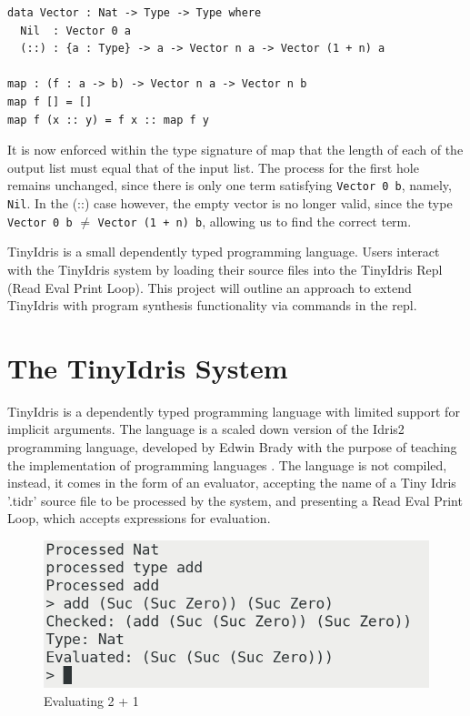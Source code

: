 \documentclass[a4paper]{article}
\begin{document}
\begin{center}
\begin{verbatim}
data Vector : Nat -> Type -> Type where
  Nil  : Vector 0 a
  (::) : {a : Type} -> a -> Vector n a -> Vector (1 + n) a

map : (f : a -> b) -> Vector n a -> Vector n b
map f [] = []
map f (x :: y) = f x :: map f y
\end{verbatim}
\end{center}

It is now enforced within the type signature of map that the length of
each of the output list must equal that of the input list. The process
for the first hole remains unchanged, since there is 
only one term satisfying \texttt{Vector 0 b}, namely, \texttt{Nil}.
In the (::) case however, the empty vector is no longer valid,
since the type \texttt{Vector 0 b} \(\neq\) \texttt{Vector (1 + n) b},
allowing us to find the correct term. 

TinyIdris is a small dependently typed programming language.
Users interact with the TinyIdris system by loading their source files
into the TinyIdris Repl (Read Eval Print Loop). This project
will outline an approach to extend TinyIdris with program synthesis
functionality via commands in the repl.

\clearpage

\section{The TinyIdris System}
\label{sec:org2a24981}

TinyIdris is a dependently typed programming language with limited
support for implicit arguments. The language is a scaled down version
of the Idris2 programming language, developed by Edwin Brady with the
purpose of teaching the implementation of programming languages
\cite{Splv'202020Aug}. The language is not compiled, instead, it comes
in the form of an evaluator, accepting the name of a 
Tiny Idris '.tidr' source file to be processed by the system,
and presenting a Read Eval Print Loop, which accepts expressions for
evaluation.

\begin{center}
\begin{figure}[htbp]
\centering
\includegraphics[scale=0.35]{./Resource/addEval.png}
\caption{Evaluating 2 + 1}
\end{figure}
\end{center}
\end{document}
